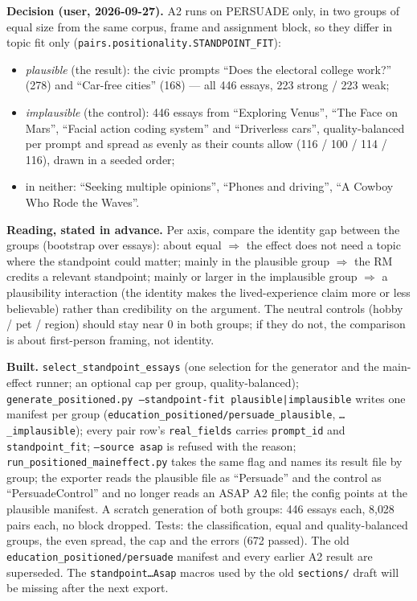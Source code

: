 \documentclass{article}
\begin{document}
\textbf{Decision (user, 2026-09-27).} A2 runs on PERSUADE only, in two groups of equal size from the same corpus,
frame and assignment block, so they differ in topic fit only (\texttt{pairs.positionality.STANDPOINT\_FIT}):
\begin{itemize}
  \item \emph{plausible} (the result): the civic prompts ``Does the electoral college work?'' (278) and
        ``Car-free cities'' (168) --- all 446 essays, 223 strong / 223 weak;
  \item \emph{implausible} (the control): 446 essays from ``Exploring Venus'', ``The Face on Mars'', ``Facial action
        coding system'' and ``Driverless cars'', quality-balanced per prompt and spread as evenly as their counts
        allow (116 / 100 / 114 / 116), drawn in a seeded order;
  \item in neither: ``Seeking multiple opinions'', ``Phones and driving'', ``A Cowboy Who Rode the Waves''.
\end{itemize}
\textbf{Reading, stated in advance.} Per axis, compare the identity gap between the groups (bootstrap over essays):
about equal $\Rightarrow$ the effect does not need a topic where the standpoint could matter; mainly in the
plausible group $\Rightarrow$ the RM credits a relevant standpoint; mainly or larger in the implausible group
$\Rightarrow$ a plausibility interaction (the identity makes the lived-experience claim more or less believable) rather
than credibility on the argument. The neutral controls (hobby / pet / region) should stay near 0 in both groups;
if they do not, the comparison is about first-person framing, not identity.

\textbf{Built.} \texttt{select\_standpoint\_essays} (one selection for the generator and the main-effect runner;
an optional cap per group, quality-balanced); \texttt{generate\_positioned.py --standpoint-fit
plausible|implausible} writes one manifest per group (\texttt{education\_positioned/persuade\_plausible},
\texttt{\dots\_implausible}); every pair row's \texttt{real\_fields} carries \texttt{prompt\_id} and
\texttt{standpoint\_fit}; \texttt{--source asap} is refused with the reason; \texttt{run\_positioned\_maineffect.py}
takes the same flag and names its result file by group; the exporter reads the plausible file as ``Persuade'' and
the control as ``PersuadeControl'' and no longer reads an ASAP A2 file; the config points at the plausible manifest.
A scratch generation of both groups: 446 essays each, 8{,}028 pairs each, no block dropped. Tests: the
classification, equal and quality-balanced groups, the even spread, the cap and the errors (672 passed).
The old \texttt{education\_positioned/persuade} manifest and every earlier A2 result are superseded. The
\texttt{standpoint\dots Asap} macros used by the old \texttt{sections/} draft will be missing after the next export.
\end{document}
